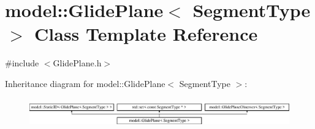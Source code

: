 \hypertarget{classmodel_1_1_glide_plane}{}\section{model\+:\+:Glide\+Plane$<$ Segment\+Type $>$ Class Template Reference}
\label{classmodel_1_1_glide_plane}


{\ttfamily \#include $<$Glide\+Plane.\+h$>$}

Inheritance diagram for model\+:\+:Glide\+Plane$<$ Segment\+Type $>$\+:\begin{figure}[H]
\begin{center}
\leavevmode
\includegraphics[height=1.300813cm]{classmodel_1_1_glide_plane}
\end{center}
\end{figure}
